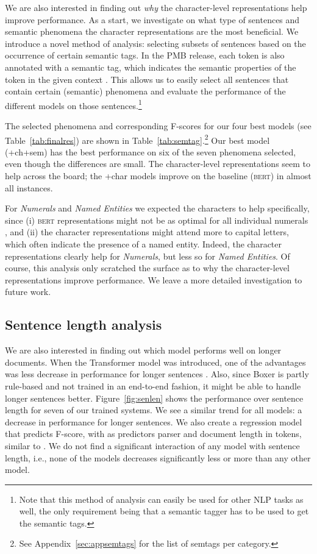 \documentclass[11pt,a4paper]{article}
\newcommand{\bert}{\textsc{bert}}
\begin{document}
We are also interested in finding out \emph{why} the character-level representations help improve performance. As a start, we investigate on what type of sentences and semantic phenomena the character representations are the most beneficial. We introduce a novel method of analysis: selecting subsets of sentences based on the occurrence of certain semantic tags. In the PMB release, each token is also annotated with a semantic tag, which indicates the semantic properties of the token in the given context \cite{semantic-tagset:17}. This allows us to easily select all sentences that contain certain (semantic) phenomena and evaluate the performance of the different models on those sentences.\footnote{Note that this method of analysis can easily be used for other NLP tasks as well, the only requirement being that a semantic tagger has to be used to get the semantic tags.}

The selected phenomena and corresponding F-scores for our four best models (see Table~\ref{tab:finalres}) are shown in Table~\ref{tab:semtag}.\footnote{See Appendix~\ref{sec:appsemtags} for the list of semtags per category.} Our best model (+ch+sem) has the best performance on six of the seven phenomena selected, even though the differences are small. The character-level representations seem to help across the board; the +char models improve on the baseline (\bert) in almost all instances.

For \emph{Numerals} and \emph{Named Entities} we expected the characters to help specifically, since (i) \bert{} representations might not be as optimal for all individual numerals \citep{wallace-etal-2019-nlp}, and (ii) the character representations might attend more to capital letters, which often indicate the presence of a named entity. Indeed, the character representations clearly help for \emph{Numerals}, but less so for \emph{Named Entities}. Of course, this analysis only scratched the surface as to why the character-level representations improve performance. We leave a more detailed investigation to future work.

\subsection{Sentence length analysis}
\label{sec:lenanalysis}

We are also interested in finding out which model performs well on longer documents. 
When the Transformer model was introduced, one of the advantages was less decrease in performance for longer sentences \citep{transformer:17}. Also, since Boxer is partly rule-based and not trained in an end-to-end fashion, it might be able to handle longer sentences better. Figure~\ref{fig:senlen} shows the performance over sentence length for seven of our trained systems. We see a similar trend for all models: a decrease in performance for longer sentences.
We also create a regression model that predicts F-score, with as predictors parser and document length in tokens, similar to \citet{drstacl:18}. We do not find a significant interaction of any model with sentence length, i.e., none of the models decreases significantly less or more than any other model.
\end{document}

